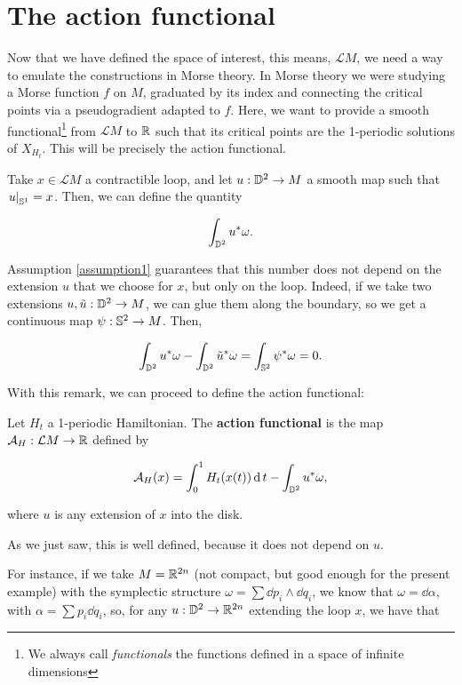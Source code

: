 \section{The action functional}

Now that we have defined the space of interest, this means, $\mathcal{L}M$, we need a way to emulate the constructions in Morse theory. In Morse theory we were studying a Morse function $f$ on $M$, graduated by its index and connecting the critical points via a pseudogradient adapted to $f$. Here, we want to provide a smooth functional\footnote{We always call {\it functionals} the functions defined in a space of infinite dimensions} from $\mathcal{L}M$ to $\mathbb{R}$ such that its critical points are the 1-periodic solutions of $X_{H_t}$. This will be precisely the action functional.

\begin{rmrk}
Take $x \in \mathcal{L}M$ a contractible loop, and let $u : \mathbb{D}^2 \rightarrow M$ a smooth map such that $\left. u \right|_{\mathbb{S}^1} = x$. Then, we can define the quantity

$$\int_{\mathbb{D}^2} u^{\ast}\omega .$$

Assumption \ref{assumption1} guarantees that this number does not depend on the extension $u$ that we choose for $x$, but only on the loop. Indeed, if we take two extensions $u, \tilde{u} : \mathbb{D}^2 \rightarrow M$, we can glue them along the boundary, so we get a continuous map $\psi : \mathbb{S}^2 \rightarrow M$. Then,

$$\int_{\mathbb{D}^2} u^{\ast} \omega - \int_{\mathbb{D}^2} \tilde{u}^{\ast} \omega = \int_{\mathbb{S}^2} \psi^{\ast} \omega = 0 .$$
\end{rmrk}

With this remark, we can proceed to define the action functional:

\begin{deff}
Let $H_t$ a 1-periodic Hamiltonian. The {\bf action functional} is the map $\mathcal{A}_H : \mathcal{L}M \rightarrow \mathbb{R}$ defined by

$$\mathcal{A}_H(x) = \int_0^1 H_t(x(t)) \operatorname d t - \int_{\mathbb{D}^2} u^{\ast} \omega ,$$

where $u$ is any extension of $x$ into the disk.
\end{deff}

As we just saw, this is well defined, because it does not depend on $u$.

For instance, if we take $M = \mathbb{R}^{2n}$ (not compact, but good enough for the present example) with the symplectic structure $\omega = \sum \dd p_i \wedge \dd q_i$, we know that $\omega = \dd \alpha$, with $\alpha = \sum p_i \dd q_i$, so, for any $u : \mathbb{D}^2 \rightarrow \mathbb{R}^{2n}$ extending the loop $x$, we have that

